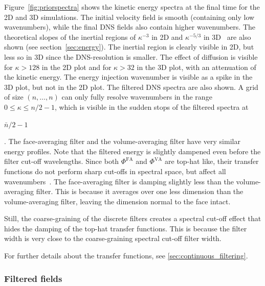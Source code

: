 \documentclass[preprint]{elsarticle}
\newcommand{\R}[1]{}
\newcommand{\revtwo}[1]{#1}
\newcommand{\revboth}[1]{#1}
\begin{document}
Figure~\ref{fig:priorspectra} shows the kinetic energy spectra at the final time
for the 2D and 3D simulations. The initial velocity field is smooth (containing
only low wavenumbers), while the final DNS fields also contain higher
wavenumbers. The theoretical slopes of the inertial regions of $\kappa^{-3}$ in 2D
and $\kappa^{-5/3}$ in 3D~\cite{Pope2000} are also shown
(see section~\ref{sec:energy}). The inertial region is clearly visible in 2D,
but less so in 3D since the DNS-resolution is smaller.
The effect of diffusion is visible for
$\kappa > 128$ in the 2D plot and for $\kappa > 32$ in the 3D plot, with an
attenuation of the kinetic energy.
\revboth{The energy injection wavenumber is visible as a spike in the 3D plot,
but not in the 2D plot.}
The filtered DNS spectra are also shown. A grid of size $(n, \dots, n)$
can only fully resolve wavenumbers in the range $0 \leq \kappa \leq n / 2 - 1$,
which is visible in the sudden stops of the filtered spectra at
\revboth{
    $\bar{n} / 2 - 1$
    
}.
The face-averaging filter and the volume-averaging filter have very similar
energy profiles. Note that the filtered energy is slightly dampened even before
the filter cut-off wavelengths. Since both $\Phi^\text{FA}$ and $\Phi^\text{VA}$
are top-hat like, their transfer functions do not perform sharp cut-offs in
spectral space, but affect all wavenumbers~\cite{Pope2000,Berselli2006}.
The face-averaging filter is damping slightly less than the volume-averaging
filter. This is because it averages over one less dimension than the
volume-averaging filter, leaving the dimension normal to the face intact.
\revboth{}
Still, the coarse-graining of the discrete filters creates a spectral
cut-off effect that hides the damping of the top-hat transfer functions. This is
because the filter width is very close to the coarse-graining spectral cut-off
filter width.
\revtwo{
    \R{transferfunctions}
    For further details about the transfer functions,
    see \ref{sec:continuous_filtering}.
}

\subsubsection{Filtered fields}
\end{document}
